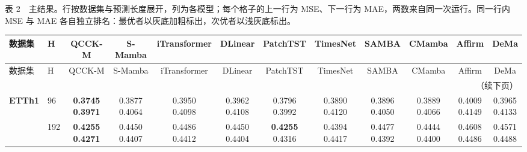 \clearpage

\fontsize{6.2}{7.2}\selectfont

表 2　主结果。行按数据集与预测长度展开，列为各模型；每个格子的上一行为 MSE、下一行为 MAE，两数来自同一次运行。同一行内 MSE 与 MAE 各自独立排名：最优者以灰底加粗标出，次优者以浅灰底标出。

\setlength{\tabcolsep}{2.2pt}

\renewcommand{\arraystretch}{0.62}

\setlength{\fboxsep}{0.5pt}

\begin{longtable}{@{}llcccccccccc@{}}
\hline
数据集 & H & QCCK-M & S-Mamba & iTransformer & DLinear & PatchTST & TimesNet & SAMBA & CMamba & Affirm & DeMa \\ \hline
\endfirsthead
\hline
数据集 & H & QCCK-M & S-Mamba & iTransformer & DLinear & PatchTST & TimesNet & SAMBA & CMamba & Affirm & DeMa \\ \hline
\endhead
\hline \multicolumn{12}{r}{（续下页）} \\
\endfoot
\hline
\endlastfoot

\textbf{ETTh1} & 96 & \shortstack{\colorbox[gray]{0.82}{\textbf{0.3745}}\\\colorbox[gray]{0.82}{\textbf{0.3971}}} & \shortstack{0.3877\\0.4064} & \shortstack{0.3950\\0.4098} & \shortstack{0.3962\\0.4108} & \shortstack{\colorbox[gray]{0.92}{0.3796}\\\colorbox[gray]{0.92}{0.3992}} & \shortstack{0.3890\\0.4120} & \shortstack{0.3896\\0.4050} & \shortstack{0.3889\\0.4066} & \shortstack{0.4009\\0.4149} & \shortstack{0.3965\\0.4133} \\ \cline{2-12}

 & 192 & \shortstack{\colorbox[gray]{0.82}{\textbf{0.4255}}\\\colorbox[gray]{0.82}{\textbf{0.4271}}} & \shortstack{0.4450\\0.4407} & \shortstack{0.4486\\0.4412} & \shortstack{0.4450\\0.4404} & \shortstack{\colorbox[gray]{0.82}{\textbf{0.4255}}\\\colorbox[gray]{0.92}{0.4316}} & \shortstack{\colorbox[gray]{0.92}{0.4394}\\0.4417} & \shortstack{0.4477\\0.4392} & \shortstack{0.4444\\0.4400} & \shortstack{0.4608\\0.4486} & \shortstack{0.4571\\0.4488} \\ \cline{2-12}


\end{longtable}
